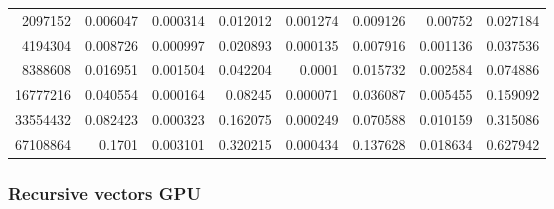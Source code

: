 \begin{tabular}{r r r r r r r r}
2097152 & 0.006047 & 0.000314 & 0.012012 & 0.001274 & 0.009126 & 0.00752 & 0.027184 \\
4194304 & 0.008726 & 0.000997 & 0.020893 & 0.000135 & 0.007916 & 0.001136 & 0.037536 \\
8388608 & 0.016951 & 0.001504 & 0.042204 & 0.0001 & 0.015732 & 0.002584 & 0.074886 \\
16777216 & 0.040554 & 0.000164 & 0.08245 & 0.000071 & 0.036087 & 0.005455 & 0.159092 \\
33554432 & 0.082423 & 0.000323 & 0.162075 & 0.000249 & 0.070588 & 0.010159 & 0.315086 \\
67108864 & 0.1701 & 0.003101 & 0.320215 & 0.000434 & 0.137628 & 0.018634 & 0.627942 \\
\end{tabular}

\subsubsection{Recursive vectors GPU}

